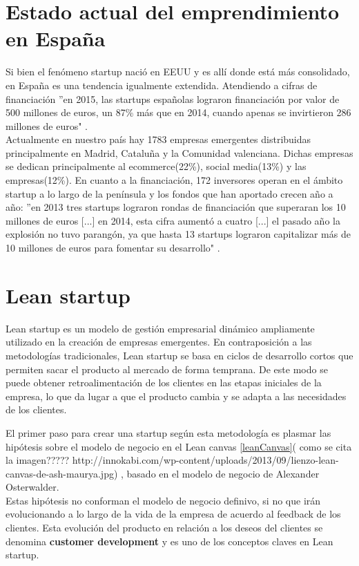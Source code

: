 \section{Estado actual del emprendimiento en España}

Si bien el fenómeno startup nació en EEUU y es allí donde está más consolidado, en España es una tendencia igualmente extendida. Atendiendo a cifras de financiación ''en 2015, las startups españolas lograron financiación por valor de 500 millones de euros, un 87\%   más que en 2014, cuando apenas se invirtieron 286 millones de euros" \cite{albertoiglesiasfraga2016}.\\
Actualmente en nuestro país hay 1783 empresas emergentes distribuidas principalmente en Madrid, Cataluña y la Comunidad valenciana. Dichas empresas se dedican principalmente al ecommerce(22\%), social media(13\%) y las empresas(12\%). En cuanto a la financiación, 172 inversores operan en el ámbito startup a lo largo de la península \cite{startupxplore2017} y los fondos que han aportado crecen año a año: ''en 2013 tres startups lograron rondas de financiación que superaran los 10 millones de euros [...] en 2014, esta cifra aumentó a cuatro [...] el pasado año la explosión no tuvo parangón, ya que hasta 13 startups lograron capitalizar más de 10 millones de euros para fomentar su desarrollo" \cite{albertoiglesiasfraga2016}. 

\section{Lean startup}

Lean startup es un modelo de gestión empresarial dinámico ampliamente utilizado en la creación de empresas emergentes. En contraposición a las metodologías tradicionales, Lean startup se basa en ciclos de desarrollo cortos que permiten sacar el producto al mercado de forma temprana. De este modo se puede obtener retroalimentación de los clientes en las etapas iniciales de la empresa, lo que da lugar a que el producto cambia y se adapta a las necesidades de los clientes.

El primer paso para crear una startup según esta metodología es plasmar las hipótesis sobre el modelo de negocio en el Lean canvas \ref{leanCanvas}( como se cita la imagen????? http://innokabi.com/wp-content/uploads/2013/09/lienzo-lean-canvas-de-ash-maurya.jpg) , basado en el modelo de negocio de Alexander Osterwalder.\\
Estas hipótesis no conforman el modelo de negocio definivo, si no que irán evolucionando a lo largo de la vida de la empresa de acuerdo al feedback de los clientes. Esta evolución del producto en relación a los deseos del clientes se denomina \textbf{customer development} y es uno de los conceptos claves en Lean startup.

